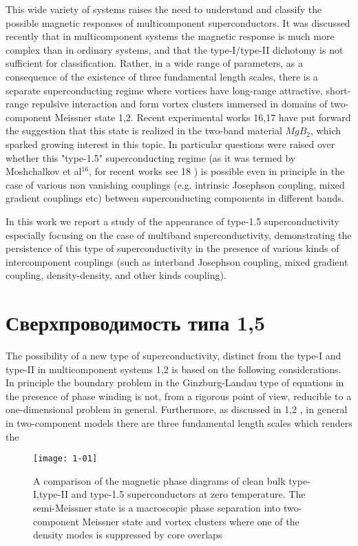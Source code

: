 This wide variety of systems raises the need to understand and classify the 
possible magnetic responses of multicomponent superconductors. It was 
discussed recently that in multicomponent systems the magnetic response is 
much more complex than in ordinary systems, and that the type-I/type-II 
dichotomy is not sufficient for classification. Rather, in a wide range of 
parameters, as a consequence of the existence of three fundamental length 
scales, there is a separate superconducting regime where vortices have 
long-range attractive, short-range repulsive interaction and form vortex 
clusters immersed in domains of two-component Meissner state 1,2. Recent 
experimental works 16,17 have put forward the suggestion that this state is 
realized in the two-band material \( MgB_2 \), which sparked growing interest 
in this topic. In particular questions were raised over whether this 
"type-1.5" superconducting regime (as it was termed by Moshchalkov et 
al\( ^{16} \), for recent works see 18 ) is possible even in principle in the 
case of various non vanishing couplings (e.g. intrinsic Josephson coupling, 
mixed gradient couplings etc) between superconducting components in different 
bands. 

In this work we report a study of the appearance of type-1.5 superconductivity 
especially focusing on the case of multiband superconductivity, demonstrating 
the persistence of this type of superconductivity in the presence of various 
kinds of intercomponent couplings (such as interband Josephson coupling, mixed 
gradient coupling, density-density, and other kinds coupling).

\section{Сверхпроводимость типа 1,5}
\label{sec:1-1}

The possibility of a new type of superconductivity, distinct from the type-I 
and type-II in multicomponent systems 1,2 is based on the following 
considerations. In principle the boundary problem in the Ginzburg-Landau type 
of equations in the presence of phase winding is not, from a rigorous point of 
view, reducible to a one-dimensional problem in general. Furthermore, as 
discussed in 1,2 , in general in two-component models there are three 
fundamental length scales which renders the

\begin{figure}[h!]
  \texttt{[image: 1-01]}
  \caption{A comparison of the magnetic phase diagrams of
    clean bulk type-I,type-II and type-1.5 superconductors at
    zero temperature. The semi-Meissner state is a macroscopic
    phase separation into two-component Meissner state and vortex
    clusters where one of the density modes is suppressed by
    core overlaps}
\end{figure}


